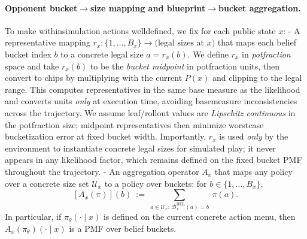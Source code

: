 \documentclass[10pt]{article}
\newcommand{\1}{\mathbf{1}}
\theoremstyle{plain}
\begin{document}
\paragraph{Opponent bucket$\to$size mapping and blueprint$\to$bucket aggregation.}
To make within\textendash simulation actions well\textendash defined, we fix for each public state $x$:
- A representative mapping $r_x:\{1,\dots,B_x\}\to \text{(legal sizes at }x)$ that maps each belief bucket index $b$ to a concrete legal size $a=r_x(b)$. We define $r_x$ in \emph{pot\textendash fraction} space and take $r_x(b)$ to be the \emph{bucket midpoint} in pot\textendash fraction units, then convert to chips by multiplying with the current $P(x)$ and clipping to the legal range. This computes representatives in the same base measure as the likelihood and converts units \emph{only} at execution time, avoiding base\textendash measure inconsistencies across the trajectory. We assume leaf/rollout values are \emph{Lipschitz continuous} in the pot\textendash fraction size; midpoint representatives then minimize worst\textendash case bucketization error at fixed bucket width. Importantly, $r_x$ is used \emph{only} by the environment to instantiate concrete legal sizes for simulated play; it never appears in any likelihood factor, which remains defined on the fixed bucket PMF throughout the trajectory.
- An aggregation operator $A_x$ that maps any policy over a concrete size set $\mathcal{U}_x$ to a policy over buckets: for $b\in\{1,\dots,B_x\}$,
\[
[A_x(\pi)](b)\ :=\ \sum_{a\in\mathcal{U}_x:\ \mathcal{B}^{\mathrm{BEL}}_x(a)=b}\ \pi(a).
\]
In particular, if $\pi_\theta(\cdot\mid x)$ is defined on the current concrete action menu, then $A_x(\pi_\theta)(\cdot\mid x)$ is a PMF over belief buckets.
\end{document}
